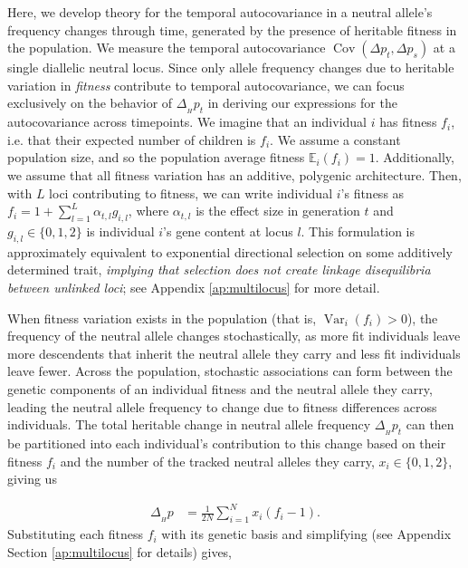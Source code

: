 \documentclass[11pt]{article}
\newcommand{\vb}[1]{{\it \color{blue} #1}}
\newcommand{\E}{\mathbb{E}}
\DeclareMathOperator{\var}{Var}
\DeclareMathOperator{\cov}{Cov}
\begin{document}
Here, we develop theory for the temporal autocovariance in a neutral allele's
frequency changes through time, generated by the presence of heritable fitness
in the population. We measure the temporal autocovariance $\cov(\Delta p_t,
\Delta p_s)$ at a single diallelic neutral locus. Since only allele frequency
changes due to heritable variation in \emph{fitness} contribute to temporal
autocovariance, we can focus exclusively on the behavior of $\Delta_{_H} p_t$
in deriving our expressions for the autocovariance across timepoints. We
imagine that an individual $i$ has fitness $f_i$, i.e. that their expected
number of children is $f_i$. We assume a constant population size, and so the
population average fitness $\E_i(f_i) = 1$. Additionally, we assume that all
fitness variation has an additive, polygenic architecture. Then, with $L$ loci
contributing to fitness, we can write individual $i$'s fitness as $f_i = 1 +
\sum_{l=1}^L \alpha_{t,l} g_{i,l}$, where $\alpha_{t,l}$ is the effect size in
generation $t$ and $g_{i,l} \in \{0, 1, 2\}$ is individual $i$'s gene content
at locus $l$. This formulation is approximately equivalent to exponential
directional selection on some additively determined trait, \vb{implying that
selection does not create linkage disequilibria between unlinked loci}; see
Appendix \ref{ap:multilocus} for more detail.

When fitness variation exists in the population (that is, $\var_i(f_i) > 0$),
the frequency of the neutral allele changes stochastically, as more fit
individuals leave more descendents that inherit the neutral allele they carry
and less fit individuals leave fewer. Across the population, stochastic
associations can form between the genetic components of an individual fitness
and the neutral allele they carry, leading the neutral allele frequency to
change due to fitness differences across individuals. The total heritable
change in neutral allele frequency $\Delta_{_H} p_t$ can then be partitioned
into each individual's contribution to this change based on their fitness $f_i$
and the number of the tracked neutral alleles they carry, $x_i \in \{0, 1,
2\}$, giving us

\begin{align}
  \Delta_{_H} p &= \frac{1}{2N} \sum_{i=1}^N x_i (f_i - 1).
\end{align}
%
Substituting each fitness $f_i$ with its genetic basis and simplifying (see
Appendix Section \ref{ap:multilocus} for details) gives,
\end{document}
